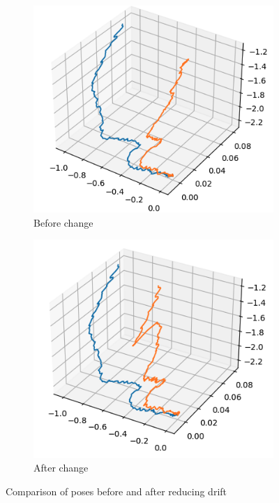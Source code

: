\documentclass[12pt, a4paper]{article}
\begin{document}
\begin{figure}[H]
  \centering
  \begin{subfigure}[b]{0.45\textwidth}
    \includegraphics[width=\textwidth]{./results/dense_slam/pose.png}
    \caption{Before change}
  \end{subfigure}
  \hfill
  \begin{subfigure}[b]{0.45\textwidth}
    \includegraphics[width=\textwidth]{./results/dense_slam/bonus_pose.png}
    \caption{After change}
  \end{subfigure}
  \caption{Comparison of poses before and after reducing drift}
\end{figure}
\end{document}
